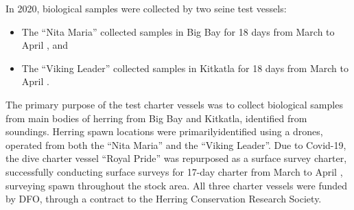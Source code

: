 In 2020, biological samples were collected by two seine test vessels:
\begin{itemize}
\item The ``Nita Maria'' collected samples in Big Bay for 18 days from March  to April , and
\item The ``Viking Leader'' collected samples in Kitkatla for 18 days from March  to April .
\end{itemize}
The primary purpose of the test charter vessels was to collect biological samples from main bodies of herring from Big Bay and Kitkatla, identified from soundings.
Herring spawn locations were primarilyidentified using a drones, operated from both the ``Nita Maria'' and the ``Viking Leader''.
Due to Covid-19, the dive charter vessel ``Royal Pride'' was repurposed as a surface survey charter, successfully conducting surface surveys for 17-day charter from March  to April , surveying spawn throughout the stock area.
All three charter vessels were funded by DFO, through a contract to the Herring Conservation Research Society.
